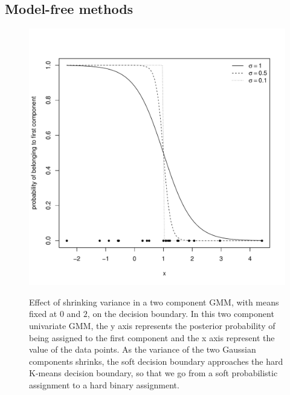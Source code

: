 \subsection{Model-free methods}

\begin{figure}
\centering
\begin{minipage}{.65\textwidth}
\includegraphics[scale=.6]{figures/gmm-variance.pdf}
\end{minipage}
{ Effect of shrinking variance in a two component \gls{GMM}, with means fixed at $0$ and $2$, on the decision boundary. }
{
  In this two component univariate \gls{GMM}, the y axis represents the posterior probability of being assigned to the first component and
  the x axis represent the value of the data points.
  As the variance of the two Gaussian components shrinks, the soft decision boundary approaches the hard K-means decision boundary, so that we go from
  a soft probabilistic assignment to a hard binary assignment. 
}
\end{figure}

